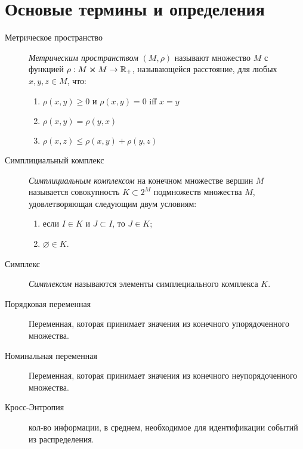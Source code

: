\section{Основые термины и определения}

\begin{description}
    \item[Метрическое пространство] {\it Метрическим пространством} $(M, \rho)$ называют множество $M$ с функцией $\rho: M \cross M \rightarrow \mathbb{R}_{+}$, называющейся расстояние, для любых $x, y, z \in M$, что:
    \begin{enumerate}
        \item $\rho(x, y) \geq 0$ и $\rho(x, y) = 0$ iff $x = y$
        \item $\rho(x, y) = \rho(y, x)$
        \item $\rho(x, z) \leq \rho(x, y) + \rho(y, z)$
    \end{enumerate}
    \item[Симплициальный комплекс] {\it Симплициальным комплексом} на конечном множестве вершин $M$ называется совокупность $K \subset 2^{M}$ подмножеств множества $M$, удовлетворяющая следующим двум условиям:
    \begin{enumerate}
        \item если $I \in K$ и $J \subset I$, то $J \in K$;
        \item $\varnothing \in K$.
    \end{enumerate}
    \item[Симплекс] {\it Симплексом} называются элементы симплециального комплекса $K$.
    \item[Порядковая переменная] Переменная, которая принимает значения из конечного упорядоченного множества.
    \item[Номинальная переменная] Переменная, которая принимает значения из конечного неупорядоченного множества.
    \item[Кросс-Энтропия] кол-во информации, в среднем, необходимое для идентификации событий из распределения.
    
\end{description}
